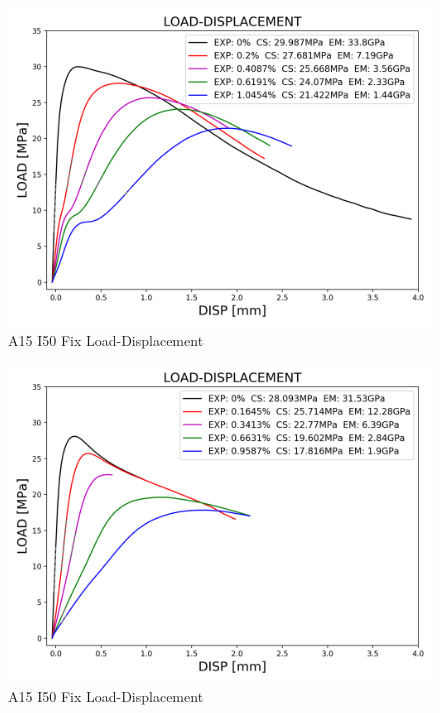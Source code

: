 
\begin{figure}[ht]
\centering
\includegraphics[width=.8\linewidth]{Files/exp_3D/DEF/S13A30FIXX-1-LOAD-DISPLACEMENT.png}
  \caption{A15 I50 Fix Load-Displacement}
  \label{fig:A30X-1FIX_LD}
\end{figure}


\begin{figure}[ht]
\centering
\includegraphics[width=.8\linewidth]{Files/exp_3D/DEF/S13A15FIXX0-LOAD-DISPLACEMENT.png}
  \caption{A15 I50 Fix Load-Displacement}
  \label{fig:A15X0FIX_LD}
\end{figure}
